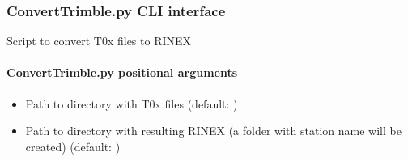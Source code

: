 \documentclass[letterpaper,10pt,english]{sphinxmanual}
\begin{document}
\begin{fulllineitems}
\label{\detokenize{com:com.ConvertTrimble.main}}
\pysigstartsignatures
{}
\pysigstopsignatures
\end{fulllineitems}



\subsubsection{ConvertTrimble.py \sphinxhyphen{} CLI interface}
\label{\detokenize{com:ConvertTrimble.py---CLI-interface}}
\sphinxAtStartPar
Script to convert T0x files to RINEX

\begin{sphinxVerbatim}[commandchars=\\\{\}]
 \PYG{p}{[}\PYG{p}{]} \PYG{p}{[} \PYG{p}{]} \PYG{p}{[}   \PYG{p}{[}\PYG{p}{]}
                  \PYG{p}{[}  \PYG{p}{[}\PYG{p}{]} \PYG{p}{]}\PYG{p}{]}
                  \PYG{p}{[}  \PYG{p}{]} \PYG{p}{[}  \PYG{p}{]}
\end{sphinxVerbatim}


\paragraph{ConvertTrimble.py positional arguments}
\label{\detokenize{com:ConvertTrimble.py-positional-arguments}}\begin{itemize}
\item {} 
\sphinxAtStartPar
{\hyperref[\detokenize{com:ConvertTrimble.py-_path-to-dir_}]{}} \sphinxhyphen{} Path to directory with T0x files (default: )

\item {} 
\sphinxAtStartPar
{\hyperref[\detokenize{com:ConvertTrimble.py-_path-to-dir_}]{}} \sphinxhyphen{} Path to directory with resulting RINEX (a folder with station name will be created) (default: )

\end{itemize}
\end{document}
